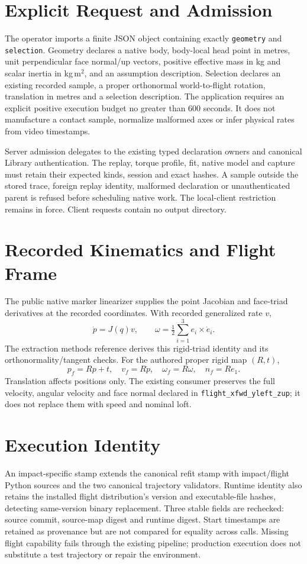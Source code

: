 \documentclass[11pt]{article}
\newcommand{\code}[1]{\nolinkurl{#1}}
\begin{document}
\newpage
\section*{Explicit Request and Admission}
The operator imports a finite JSON object containing exactly \code{geometry}
and \code{selection}. Geometry declares a native body, body-local head point
in metres, unit perpendicular face normal/up vectors, positive effective mass
in kg and scalar inertia in kg\,m$^2$, and an assumption description. Selection
declares an existing recorded sample, a proper orthonormal world-to-flight
rotation, translation in metres and a selection description. The application
requires an explicit positive execution budget no greater than 600 seconds.
It does not manufacture a contact sample, normalize malformed axes or infer
physical rates from video timestamps.

Server admission delegates to the existing typed declaration owners and
canonical Library authentication. The replay, torque profile, fit, native model
and capture must retain their expected kinds, session and exact hashes. A sample
outside the stored trace, foreign replay identity, malformed declaration or
unauthenticated parent is refused before scheduling native work. The local-client
restriction remains in force. Client requests contain no output directory.

\section*{Recorded Kinematics and Flight Frame}
The public native marker linearizer supplies the point Jacobian and face-triad
derivatives at the recorded coordinates. With recorded generalized rate $v$,
\[
\dot p=J(q)v,\qquad
\omega=\tfrac12\sum_{i=1}^{3}e_i\times\dot e_i.
\]
The extraction methods reference derives this rigid-triad identity and its
orthonormality/tangent checks. For the authored proper rigid map $(R,t)$,
\[
p_f=Rp+t,\quad v_f=R\dot p,\quad \omega_f=R\omega,\quad n_f=Re_1.
\]
Translation affects positions only. The existing consumer preserves the full
velocity, angular velocity and face normal declared in
\code{flight_xfwd_yleft_zup}; it does not replace them with speed and nominal loft.

\section*{Execution Identity}
An impact-specific stamp extends the canonical refit stamp with impact/flight
Python sources and the two canonical trajectory validators. Runtime identity
also retains the installed flight distribution's version and executable-file
hashes, detecting same-version binary replacement. Three stable fields are
rechecked: source commit, source-map digest and runtime digest. Start timestamps
are retained as provenance but are not compared for equality across calls.
Missing flight capability fails through the existing pipeline; production
execution does not substitute a test trajectory or repair the environment.
\end{document}
